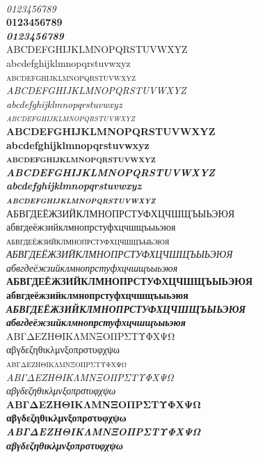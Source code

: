 \documentclass[10pt]{article}
\begin{document}
\begin{sloppypar}
\begin{figure}[ht]
\begin{minipage}[b]{0.45\linewidth}
\\
\textit{0123456789}\\
\textbf{0123456789}\\
\textbf{\textit{0123456789}}\\

\noindent
ABCDEFGHIJKLMNOPQRSTUVWXYZ\\
abcdefghijklmnopqrstuvwxyz\\
\textsc{abcdefghijklmnopqrstuvwxyz}\\
\textit{ABCDEFGHIJKLMNOPQRSTUVWXYZ\\
abcdefghijklmnopqrstuvwxyz\\
\textsc{abcdefghijklmnopqrstuvwxyz}}\\
\textbf{ABCDEFGHIJKLMNOPQRSTUVWXYZ\\
abcdefghijklmnopqrstuvwxyz\\
\textsc{abcdefghijklmnopqrstuvwxyz}}\\
\textbf{\textit{ABCDEFGHIJKLMNOPQRSTUVWXYZ\\
abcdefghijklmnopqrstuvwxyz\\
\textsc{abcdefghijklmnopqrstuvwxyz}}}\\

\noindent
АБВГДЕЁЖЗИЙКЛМНОПРСТУФХЦЧШЩЪЫЬЭЮЯ \\
абвгдеёжзийклмнопрстуфхцчшщъыьэюя \\
\textsc{абвгдеёжзийклмнопрстуфхцчшщъыьэюя}\\
\textit{АБВГДЕЁЖЗИЙКЛМНОПРСТУФХЦЧШЩЪЫЬЭЮЯ\\
абвгдеёжзийклмнопрстуфхцчшщъыьэюя }\\
\textbf{АБВГДЕЁЖЗИЙКЛМНОПРСТУФХЦЧШЩЪЫЬЭЮЯ \\
абвгдеёжзийклмнопрстуфхцчшщъыьэюя }\\
\textbf{\textit{АБВГДЕЁЖЗИЙКЛМНОПРСТУФХЦЧШЩЪЫЬЭЮЯ \\
абвгдеёжзийклмнопрстуфхцчшщъыьэюя }}\\


\noindent
ΑΒΓΔΕΖΗΘΙΚΛΜΝΞΟΠΡΣΤΥΦΧΨΩ\\
αβγδεζηθικλμνξοπρστυφχψω\\
\textsc{αβγδεζηθικλμνξοπρστυφχψω}\\
\textit{ΑΒΓΔΕΖΗΘΙΚΛΜΝΞΟΠΡΣΤΥΦΧΨΩ\\
αβγδεζηθικλμνξοπρστυφχψω \\}
\textbf{ΑΒΓΔΕΖΗΘΙΚΛΜΝΞΟΠΡΣΤΥΦΧΨΩ\\
αβγδεζηθικλμνξοπρστυφχψω}\\
\textbf{\textit{ΑΒΓΔΕΖΗΘΙΚΛΜΝΞΟΠΡΣΤΥΦΧΨΩ\\
αβγδεζηθικλμνξοπρστυφχψω}}\\


\end{minipage}
\end{figure}
\end{sloppypar}
\end{document}
